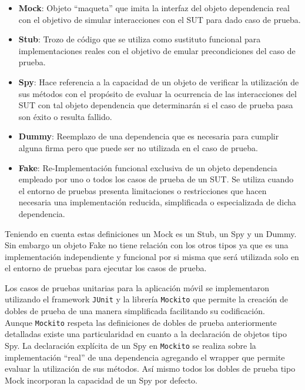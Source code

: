 \begin{itemize}
	\item \textbf{Mock}: Objeto ``maqueta'' que imita la interfaz del objeto dependencia real con el objetivo de simular interacciones con el SUT para dado caso de prueba.
	\item \textbf{Stub}: Trozo de código que se utiliza como sustituto funcional para implementaciones reales con el objetivo de emular precondiciones del caso de prueba.
	\item \textbf{Spy}: Hace referencia a la capacidad de un objeto de verificar la utilización de sus métodos con el propósito de evaluar la ocurrencia de las interacciones del SUT con tal objeto dependencia que determinarán si el caso de prueba pasa son éxito o resulta fallido.
	\item \textbf{Dummy}: Reemplazo de una dependencia que es necesaria para cumplir alguna firma pero que puede ser no utilizada en el caso de prueba.
	\item \textbf{Fake}: Re-Implementación funcional exclusiva de un objeto dependencia empleado por uno o todos los casos de prueba de un SUT. Se utiliza cuando el entorno de pruebas presenta limitaciones o restricciones que hacen necesaria una implementación reducida, simplificada o especializada de dicha dependencia. 
\end{itemize}

Teniendo en cuenta estas definiciones un Mock es un Stub, un Spy y un Dummy. 
Sin embargo un objeto Fake no tiene relación con los otros tipos ya que es una implementación independiente y funcional por si misma que será utilizada solo en el entorno de pruebas para ejecutar los casos de prueba.

Los casos de pruebas unitarias para la aplicación móvil se implementaron utilizando el framework \texttt{JUnit} y la librería \texttt{Mockito} que permite la creación de dobles de prueba de una manera simplificada facilitando su codificación.\\
Aunque \texttt{Mockito} respeta las definiciones de dobles de prueba anteriormente detalladas existe una particularidad en cuanto a la declaración de objetos tipo Spy. La declaración explícita de un Spy en \texttt{Mockito} se realiza sobre la implementación ``real'' de una dependencia agregando el wrapper que permite evaluar la utilización de sus métodos. Así mismo todos los dobles de prueba tipo Mock incorporan la capacidad de un Spy por defecto.

